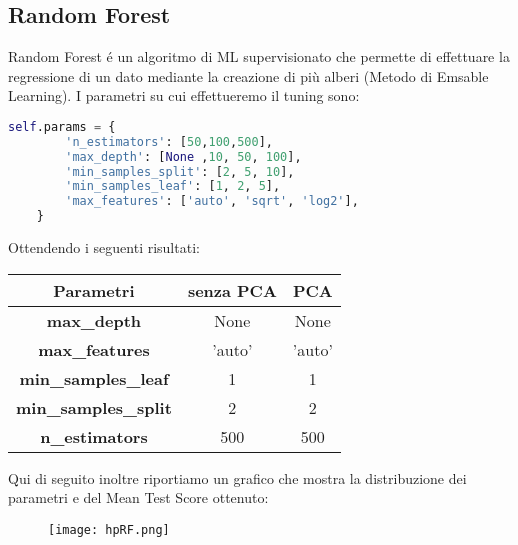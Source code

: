 \documentclass[../../Report.tex]{subfiles}
\begin{document}
\subsection{Random Forest}
Random Forest é un algoritmo di ML supervisionato che permette di effettuare la regressione di un dato mediante la creazione di più alberi (Metodo di Emsable Learning).
I parametri su cui effettueremo il tuning sono:
\begin{lstlisting}[language=Python]
    self.params = {
        'n_estimators': [50,100,500],
        'max_depth': [None ,10, 50, 100],
        'min_samples_split': [2, 5, 10],
        'min_samples_leaf': [1, 2, 5],
        'max_features': ['auto', 'sqrt', 'log2'],
    }
\end{lstlisting}
Ottendendo i seguenti risultati:
\begin{table}[h]
    \centering
    \begin{tabular}{|c|c|c|}
    \hline
\textbf{Parametri} & \textbf{senza PCA} & \textbf{PCA} \\ \hline
\textbf{max\_depth}& None & None\\
\textbf{max\_features}& 'auto' &  'auto' \\
\textbf{min\_samples\_leaf}& 1 & 1\\
\textbf{min\_samples\_split}& 2 & 2\\
\textbf{n\_estimators}& 500 & 500\\
\hline

\end{tabular}
\end{table}
Qui di seguito inoltre riportiamo un grafico che mostra la distribuzione dei parametri e del Mean Test Score ottenuto:
\begin{figure}
    \centering
    \texttt{[image: hpRF.png]}
\end{figure}
\end{document}
